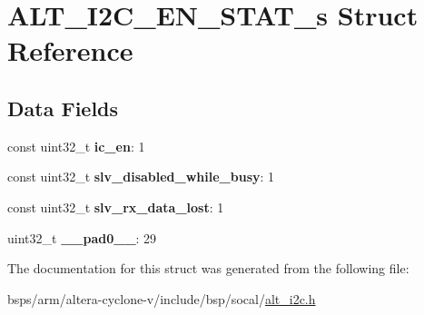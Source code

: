 \hypertarget{structALT__I2C__EN__STAT__s}{}\section{A\+L\+T\+\_\+\+I2\+C\+\_\+\+E\+N\+\_\+\+S\+T\+A\+T\+\_\+s Struct Reference}
\label{structALT__I2C__EN__STAT__s}
\subsection*{Data Fields}
\begin{DoxyCompactItemize}
\item 
\mbox{\label{structALT__I2C__EN__STAT__s_abd814458d5cbddd47c21f000226c9423}} 
const uint32\+\_\+t {\bfseries ic\+\_\+en}\+: 1
\item 
\mbox{\label{structALT__I2C__EN__STAT__s_a6738462b8a08134a4f22e6d93803ebe6}} 
const uint32\+\_\+t {\bfseries slv\+\_\+disabled\+\_\+while\+\_\+busy}\+: 1
\item 
\mbox{\label{structALT__I2C__EN__STAT__s_a4e2a5c6f2b5d635c80b2b7e3a466d9c2}} 
const uint32\+\_\+t {\bfseries slv\+\_\+rx\+\_\+data\+\_\+lost}\+: 1
\item 
\mbox{\label{structALT__I2C__EN__STAT__s_a1eda59bcaa93f87757f48b05a306ca70}} 
uint32\+\_\+t {\bfseries \+\_\+\+\_\+pad0\+\_\+\+\_\+}\+: 29
\end{DoxyCompactItemize}


The documentation for this struct was generated from the following file\+:\begin{DoxyCompactItemize}
\item 
bsps/arm/altera-\/cyclone-\/v/include/bsp/socal/\mbox{\hyperlink{socal_2alt__i2c_8h}{alt\+\_\+i2c.\+h}}\end{DoxyCompactItemize}
